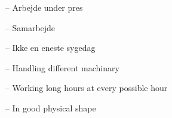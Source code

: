 \documentclass[10pt,a4paper]{altacv}
\begin{document}
\begin{itemize}
    \setlength{\itemindent}{0.1ex}
    \item[--]   \small{Arbejde under pres}
    \item[--]   \small{Samarbejde}
    \item[--]   \small{Ikke en eneste sygedag}
\end{itemize}

\begin{itemize}
    \setlength{\itemindent}{0.1ex}
    \item[--]   \small{Handling different machinary}
    \item[--]   \small{Working long hours at every possible hour}
    \item[--]   \small{In good physical shape}
\end{itemize}

% 
% 

\medskip


\end{document}

